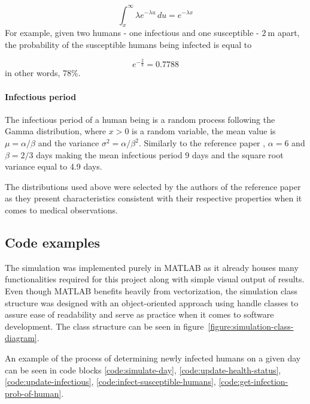 \documentclass[a4paper]{article}
\begin{document}
\begin{equation}
	\int_{x}^{\infty} \lambda e^{-\lambda u} \,du = e^{-\lambda x} 
\end{equation}
\noindent
For example, given two humans - one infectious and one susceptible - $2\:\textrm{m}$ apart, the probability of the susceptible humans being infected is equal to

\begin{equation}
	e^{- \frac{2}{8}} = 0.7788
\end{equation}
\noindent
in other words, 78\%.

\paragraph{Infectious period}
The infectious period of a human being is a random process following the Gamma distribution, where $x > 0$ is a random variable, the mean value is $\mu = \alpha/\beta$ and the variance $ \sigma^2 = \alpha/\beta^2$. Similarly to the reference paper \cite{Maltezos2021}, $\alpha = 6$ and $\beta = 2/3$ days making the mean infectious period 9 days and the square root variance equal to 4.9 days. \newline

\par
The distributions used above were selected by the authors of the reference paper \cite{Maltezos2021} as they present characteristics consistent with their respective properties when it comes to medical observations.



\subsection{Code examples}
The simulation was implemented purely in MATLAB as it already houses many functionalities required for this project along with simple visual output of results. Even though MATLAB benefits heavily from vectorization, the simulation class structure was designed with an object-oriented approach using handle classes to assure ease of readability and serve as practice when it comes to software development. The class structure can be seen in figure~\ref{figure:simulation-class-diagram}.

An example of the process of determining newly infected humans on a given day can be seen in code blocks \ref{code:simulate-day}, \ref{code:update-health-status}, \ref{code:update-infectious}, \ref{code:infect-susceptible-humans}, \ref{code:get-infection-prob-of-human}.
\end{document}
